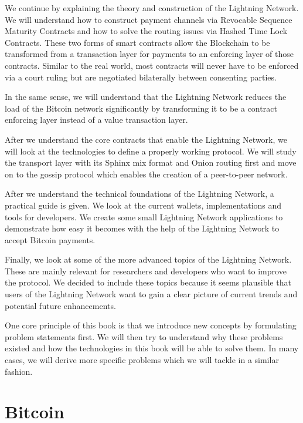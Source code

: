 \documentclass[a4paper,12pt,oneside,openany]{book}
\begin{document}
We continue by explaining the theory and construction of the Lightning Network.
We will understand how to construct payment channels via Revocable Sequence Maturity Contracts and how to solve the routing issues via Hashed Time Lock Contracts.
These two forms of smart contracts allow the Blockchain to be transformed from a transaction layer for payments to an enforcing layer of those contracts.
Similar to the real world, most contracts will never have to be enforced via a court ruling but are negotiated bilaterally between consenting parties.

In the same sense, we will understand that the Lightning Network reduces the load of the Bitcoin network significantly by transforming it to be a contract enforcing layer instead of a value transaction layer.

After we understand the core contracts that enable the Lightning Network, we will look at the technologies to define a properly working protocol.
We will study the transport layer with its Sphinx mix format and Onion routing first and move on to the gossip protocol which enables the creation of a peer-to-peer network.

After we understand the technical foundations of the Lightning Network, a practical guide is given.
We look at the current wallets, implementations and tools for developers.
We create some small Lightning Network applications to demonstrate how easy it becomes with the help of the Lightning Network to accept Bitcoin payments.

Finally, we look at some of the more advanced topics of the Lightning Network.
These are mainly relevant for researchers and developers who want to improve the protocol.
We decided to include these topics because it seems plausible that users of the Lightning Network want to gain a clear picture of current trends and potential future enhancements. 

One core principle of this book is that we introduce new concepts by formulating problem statements first. We will then try to understand why these problems existed and how the technologies in this book will be able to solve them. In many cases, we will derive more specific problems which we will tackle in a similar fashion.

\chapter{Bitcoin}
\end{document}
